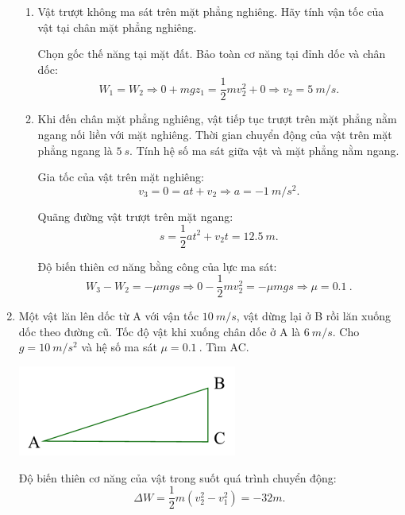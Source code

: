 \begin{enumerate}[label=\bfseries Câu \arabic*:]
	\hideall
	{	
		\begin{enumerate}[label=\alph*)]
			\item Vật trượt không ma sát trên mặt phẳng nghiêng. Hãy tính vận tốc của vật tại chân mặt phẳng nghiêng.
			
			Chọn gốc thế năng tại mặt đất. Bảo toàn cơ năng tại đỉnh dốc và chân dốc:
			$$W_1 = W_2 \Rightarrow 0 + mgz_1 = \dfrac{1}{2}mv_2^2 + 0 \Rightarrow v_2 = \SI{5}{m/s}.$$
			
			\item Khi đến chân mặt phẳng nghiêng, vật tiếp tục trượt trên mặt phẳng nằm ngang nối liền với mặt nghiêng. Thời gian chuyển động của vật trên mặt phẳng ngang là $\SI{5}{s}$. Tính hệ số ma sát giữa vật và mặt phẳng nằm ngang.
			
			Gia tốc của vật trên mặt nghiêng:
			$$v_3 = 0 = at + v_2 \Rightarrow a = \SI{-1}{m/s^2}.$$
			
			Quãng đường vật trượt trên mặt ngang:
			$$s=\dfrac{1}{2}at^2 + v_2 t = \SI{12.5}{m}.$$
			
			Độ biến thiên cơ năng bằng công của lực ma sát:
			$$W_3 - W_2 = -\mu mg s \Rightarrow 0 - \dfrac{1}{2}mv_2^2 = -\mu mg s \Rightarrow \mu = \SI{0.1}{}.$$	
			
		\end{enumerate}
	}
	\item {}
	
	
	{
			\begin{minipage}[l]{0.7\textwidth}
			
			Một vật lăn lên dốc từ A với vận tốc $\SI{10}{m/s}$, vật dừng lại ở B rồi lăn xuống dốc theo đường cũ. Tốc độ vật khi xuống chân dốc ở A là $\SI{6}{m/s}$. Cho $g=\SI{10}{m/s^2}$ và hệ số ma sát $\mu = \SI{0.1}{}$. Tìm AC.
			
		\end{minipage}
		\begin{minipage}[r]{0.25\textwidth}
			\hspace*{0.9cm}
			\includegraphics[scale=0.5]{../figs/VN10-2022-PH-TP029-5}
		\end{minipage}
	}
	
	\hideall
	{	
			Độ biến thiên cơ năng của vật trong suốt quá trình chuyển động:
		$$\Delta W = \dfrac{1}{2} m (v_2^2 - v_1^2)=-32m.$$
		
}
\end{enumerate}
